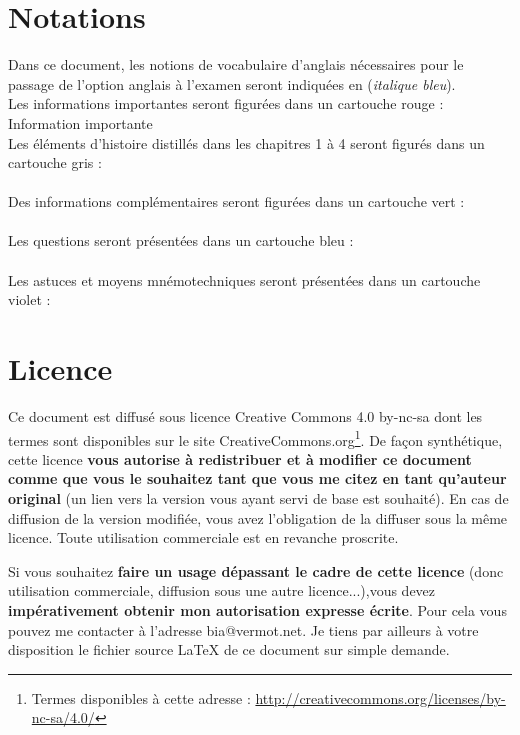 \documentclass[a4paper,12pt,oneside]{report} %
\newcommand{\anglais}[1]{(\textit{\color{blue}#1})}
\begin{document}
	
	
	\section{Notations}
	Dans ce document, les notions de vocabulaire d'anglais nécessaires pour le passage de l'option anglais à l'examen seront indiquées en \anglais{italique bleu}. \\
	
	Les informations importantes seront figurées dans un cartouche rouge : \nobreak\\
	\alert{Information importante}\\
	
	Les éléments d'histoire distillés dans les chapitres 1 à 4 seront figurés dans un cartouche gris :\nobreak\\
	 \\
	
	Des informations complémentaires seront figurées dans un cartouche vert : \nobreak\\
	 \\
	
	Les questions seront présentées dans un cartouche bleu :  \nobreak\\
	 \\
	
	Les astuces et moyens mnémotechniques seront présentées dans un cartouche violet :  \nobreak\\

	\section{Licence}
	Ce document est diffusé sous licence Creative Commons 4.0 by-nc-sa dont les termes sont disponibles sur le site CreativeCommons.org\footnote{Termes disponibles à cette adresse : \url{http://creativecommons.org/licenses/by-nc-sa/4.0/}}. De façon synthétique, cette licence \textbf{vous autorise à redistribuer et à modifier ce document comme que vous le souhaitez tant que vous me citez en tant qu'auteur original} (un lien vers la version vous ayant servi de base est souhaité). En cas de diffusion de la version modifiée, vous avez l'obligation de la diffuser sous la même licence. Toute utilisation commerciale est en revanche proscrite. 
	
	Si vous souhaitez \textbf{faire un usage dépassant le cadre de cette licence} (donc utilisation commerciale, diffusion sous une autre licence...),vous devez \textbf{impérativement obtenir mon autorisation expresse écrite}. Pour cela vous pouvez me contacter à l'adresse bia@vermot.net. Je tiens par ailleurs à votre disposition le fichier source \LaTeX{} de ce document sur simple demande.
\end{document}

